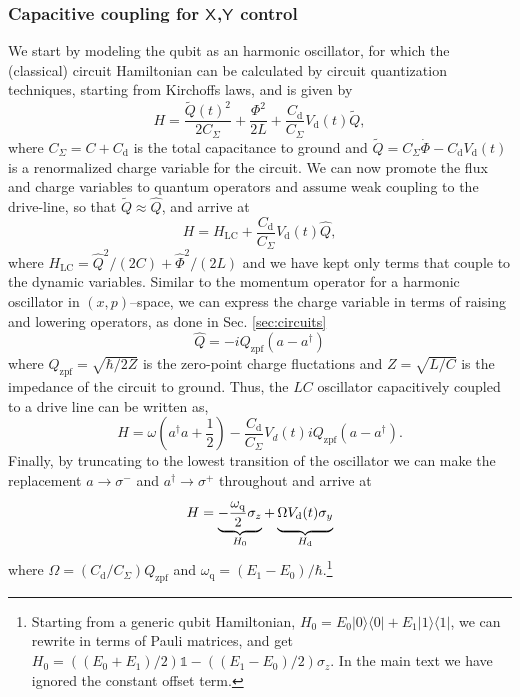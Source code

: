 \documentclass[aip,apr,twocolumn,showpacs,superscriptaddress,groupedaddress,nofootinbib,reprint]{revtex4-1}  %
\newcommand{\X}[1]{\textsf{X}_{#1}}
\newcommand{\Y}[1]{\textsf{Y}_{#1}}
\newcommand{\freq}{\omega_\text{q}}
\renewcommand{\d}{\text{d}}
\begin{document}
\subsubsection{\label{sec:capacitivecoupling}Capacitive coupling for $\X{}$,$\Y{}$ control}
We start by modeling the qubit as an harmonic oscillator, for which the (classical) circuit Hamiltonian can be calculated by circuit quantization techniques, starting from Kirchoffs laws, and is given by \cite{SankPhD2014}
\begin{equation}
H = \frac{\tilde Q(t)^2}{2C_\Sigma}+\frac{\Phi^2}{2L}+\frac{C_\text{d}}{C_\Sigma}V_\text{d}(t)\tilde Q,
\end{equation}
where $C_\Sigma = C+C_\text{d}$ is the total capacitance to ground and $\tilde Q = C_\Sigma \dot \Phi - C_\text{d}V_\text{d}(t)$ is a renormalized charge variable for the circuit. We can now promote the flux and charge variables to quantum operators and assume weak coupling to the drive-line, so that $\tilde Q \approx \hat Q$, and arrive at
\begin{equation}
H = H_\text{LC} + \frac{C_\text{d}}{C_\Sigma}V_\text{d}(t) \hat Q \label{eq:quantumLCwithDrive},
\end{equation}
where $H_\text{LC} = \hat Q^2/(2C) + \hat \Phi^2/(2L)$ and we have kept only terms that couple to the dynamic variables. Similar to the momentum operator for a harmonic oscillator in $(x,p)$--space, we can express the charge variable in terms of raising and lowering operators, as done in Sec. \ref{sec:circuits}
\begin{equation}
 \hat Q = -iQ_\text{zpf}\left(a-a^\dagger \right)
\end{equation}
where $Q_\text{zpf} = \sqrt{\hbar/2Z}$ is the zero-point charge fluctations and $Z=\sqrt{L/C}$ is the impedance of the circuit to ground. Thus, the $LC$ oscillator capacitively coupled to a drive line can be written as,
\begin{equation}
H = \omega \left(a^\dagger a + \frac{1}{2}\right) - \frac{C_\text{d}}{C_\Sigma}V_d(t) iQ_\text{zpf}\left(a-a^\dagger \right). \label{eq:DriveNlevels}
\end{equation}
Finally, by truncating to the lowest transition of the oscillator we can make the replacement $a \rightarrow \sigma^-$ and $a^\dagger \rightarrow \sigma^+$ throughout and arrive at
\begin{equation}
H = \underbrace{-\frac{\freq}{2}\sigma_z}_{H_0}+\underbrace{\vphantom{\frac{1}{2}}\Omega V_\text{d}(t)\sigma_y}_{H_\d} \label{eq:DriveHamLabFrame}
\end{equation}
where $ \Omega = (C_\text{d}/C_\Sigma)Q_\text{zpf}$ and $\freq = (E_1 - E_0)/\hbar$.\footnote{Starting from a generic qubit Hamiltonian, $H_0 = E_0 |0\rangle\langle 0| + E_1|1\rangle\langle 1|$, we can rewrite in terms of Pauli matrices, and get $H_0 = ((E_0+E_1)/2) \mathds{1} - ((E_1-E_0)/2) \sigma_z$. In the main text we have ignored the constant offset term.}
\end{document}
